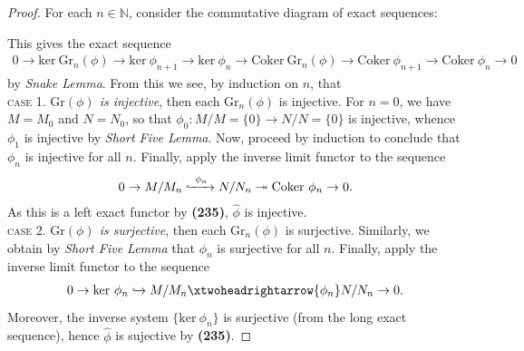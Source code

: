 \documentclass[12pt,a4paper,footinclude=true,headinclude=true]{scrbook} %
\begin{document}
\begin{proof}
    For each $n\in\mathbb{N}$, consider the commutative diagram of exact sequences:
    \begin{center}
    \end{center}
    This gives the exact sequence 
    \begin{align*}
        0\to\mathrm{ker\ Gr}_n(\phi)\to\mathrm{ker}\ \phi_{n+1}\to\mathrm{ker}\ \phi_{n}\to\mathrm{Coker\ Gr}_n(\phi)\to\mathrm{Coker}\ \phi_{n+1}\to\mathrm{Coker}\ \phi_{n}\to0
    \end{align*}
    by \textit{Snake Lemma}. From this we see, by induction on $n$, that\\
    \textsc{case 1.} \textit{$\mathrm{Gr}(\phi)$ is injective}, then each $\mathrm{Gr}_n(\phi)$ is injective. For $n=0$, we have $M=M_0$ and $N=N_0$, so that $\phi_0:M/M=\{0\}\to N/N=\{0\}$ is injective, whence $\phi_1$ is injective by \textit{Short Five Lemma}. Now, proceed by induction to conclude that $\phi_n$ is injective for all $n$. Finally, apply the inverse limit functor to the sequence 
    \begin{align*}
        0\to M/M_n\xhookrightarrow{~\phi_n~} N/N_n\twoheadrightarrow \mathrm{Coker}\ \phi_n\to0.
    \end{align*}
    As this is a left exact functor by \textbf{(235)}, $\widehat{\phi}$ is injective.\\
    \textsc{case 2.} \textit{$\mathrm{Gr}(\phi)$ is surjective}, then each $\mathrm{Gr}_n(\phi)$ is surjective. Similarly, we obtain by \textit{Short Five Lemma} that $\phi_n$ is surjective for all $n$. Finally, apply the inverse limit functor to the sequence 
    \begin{align*}
        0\to \mathrm{ker}\ \phi_n\xhookrightarrow{} M/M_n\xtwoheadrightarrow{\phi_n} N/N_n\to0.
    \end{align*}
    Moreover, the inverse system $\{\mathrm{ker}\ \phi_n\}$ is surjective (from the long exact sequence), hence $\widehat{\phi}$ is sujective by \textbf{(235)}.
\end{proof}
\end{document}
